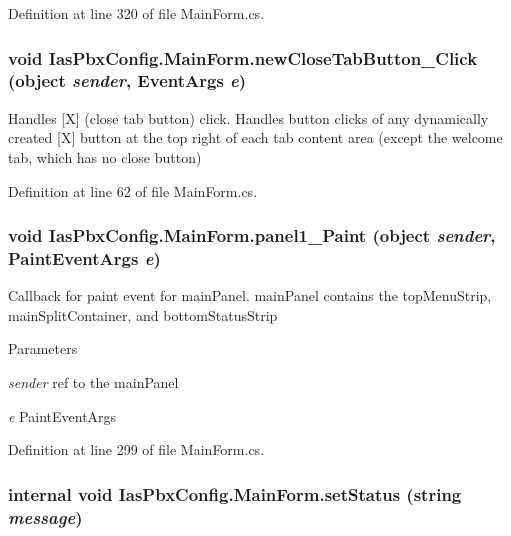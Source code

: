 Definition at line 320 of file MainForm.cs.\hypertarget{class_ias_pbx_config_1_1_main_form_aac03f1254a13b3780e0bd66838c65654}{
\subsubsection[{newCloseTabButton\_\-Click}]{\setlength{\rightskip}{0pt plus 5cm}void IasPbxConfig.MainForm.newCloseTabButton\_\-Click (object {\em sender}, \/  EventArgs {\em e})}}
\label{class_ias_pbx_config_1_1_main_form_aac03f1254a13b3780e0bd66838c65654}


Handles \mbox{[}X\mbox{]} (close tab button) click. Handles button clicks of any dynamically created \mbox{[}X\mbox{]} button at the top right of each tab content area (except the welcome tab, which has no close button) 

Definition at line 62 of file MainForm.cs.\hypertarget{class_ias_pbx_config_1_1_main_form_a220eaac9b10c90352a62fcb1eea7cfb1}{
\subsubsection[{panel1\_\-Paint}]{\setlength{\rightskip}{0pt plus 5cm}void IasPbxConfig.MainForm.panel1\_\-Paint (object {\em sender}, \/  PaintEventArgs {\em e})}}
\label{class_ias_pbx_config_1_1_main_form_a220eaac9b10c90352a62fcb1eea7cfb1}


Callback for paint event for mainPanel. mainPanel contains the topMenuStrip, mainSplitContainer, and bottomStatusStrip 
\begin{DoxyParams}{Parameters}
\item[{\em sender}]ref to the mainPanel \item[{\em e}]PaintEventArgs \end{DoxyParams}


Definition at line 299 of file MainForm.cs.\hypertarget{class_ias_pbx_config_1_1_main_form_aa956e1dc7f6496157f289d79d19a18ab}{
\subsubsection[{setStatus}]{\setlength{\rightskip}{0pt plus 5cm}internal void IasPbxConfig.MainForm.setStatus (string {\em message})}}
\label{class_ias_pbx_config_1_1_main_form_aa956e1dc7f6496157f289d79d19a18ab}


